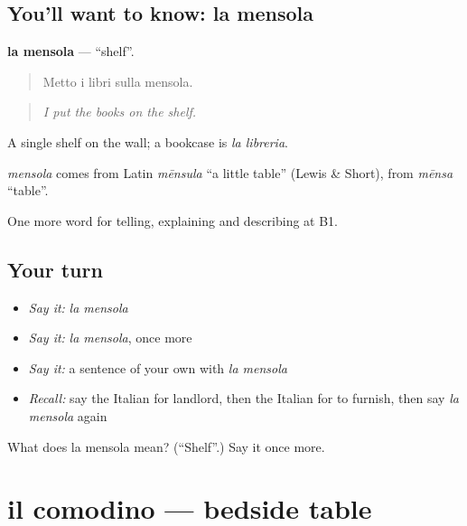 \subsection*{You'll want to know: la mensola}
\textbf{la mensola} — \textquotedblleft{}shelf\textquotedblright{}.

\begin{quote}
Metto i libri sulla mensola.
\end{quote}

\begin{quote}
\emph{I put the books on the shelf.}
\end{quote}

A single shelf on the wall; a bookcase is \emph{la libreria}.

\begin{cousinweb}
\emph{mensola} comes from Latin \emph{mēnsula} \textquotedblleft{}a little table\textquotedblright{} (Lewis \& Short), from \emph{mēnsa} \textquotedblleft{}table\textquotedblright{}.
\end{cousinweb}

\begin{grammarlens}[title={What you've built}]
One more word for telling, explaining and describing at B1.
\end{grammarlens}

\subsection*{Your turn}
\begin{itemize}
\raggedright
  \item \emph{Say it:} \emph{la mensola}
  \item \emph{Say it:} \emph{la mensola}, once more
  \item \emph{Say it:} a sentence of your own with \emph{la mensola}
  \item \emph{Recall:} say the Italian for landlord, then the Italian for to furnish, then say \emph{la mensola} again
\end{itemize}

\begin{tcolorbox}[breakable,colback=teal!4,colframe=teal!35!black,title={Before you move on}]
What does la mensola mean? (\textquotedblleft{}Shelf\textquotedblright{}.) Say it once more.
\end{tcolorbox}
\section[il comodino]{il comodino — bedside table}

